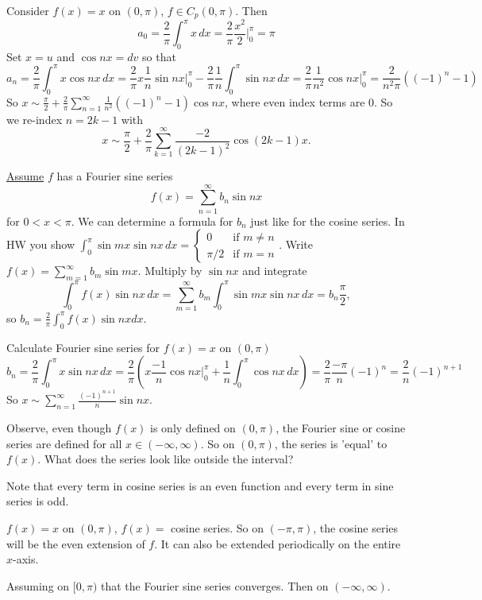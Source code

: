 \documentclass[]{article}
\begin{document}
\begin{example}
	Consider $f(x) = x$ on $(0,\pi)$, $f\in C_p(0,\pi)$. Then
	$$a_0 = \frac{2}{\pi}\int_0^\pi x \, dx = \frac{2}{\pi} \frac{x^2}{2}\bigg\rvert_0^\pi = \pi$$
	Set $x=u$ and $\cos nx = dv$ so that
	$$a_n = \frac{2}{\pi}\int_0^\pi x\cos{nx} \, dx = \frac{2}{\pi} x \frac{1}{n} \sin{nx} \bigg\rvert_0^\pi - \frac{2}{\pi} \frac{1}{n} \int_0^\pi \sin{nx} \, dx = \frac{2}{\pi} \frac{1}{n^2} \cos{nx}\bigg\rvert_0^\pi = \frac{2}{n^2\pi} \left( (-1)^n - 1\right)$$
	So $x\sim \frac{\pi}{2} + \frac{2}{\pi}\sum_{n=1}^\infty \frac{1}{n^2}((-1)^n-1) \cos{nx}$, where even index terms are 0. So we re-index $n=2k-1$ with $$x\sim \frac{\pi}{2} + \frac{2}{\pi} \sum_{k=1}^{\infty}\frac{-2}{(2k-1)^2}\cos(2k-1)x.$$
\end{example}

\underline{Assume} $f$ has a Fourier sine series
$$f(x) = \sum_{n=1}^\infty b_n \sin{nx}$$
for $0<x<\pi$.
We can determine a formula for $b_n$ just like for the cosine series.
In HW you show $\int_0^\pi \sin{mx} \sin{nx} \, dx = \begin{cases}0 &\text{if }m\neq n \\ \pi/2 &\text{if }m=n\end{cases}$.
Write $f(x) = \sum_{m=1}^{\infty} b_m \sin{mx}$. Multiply by $\sin{nx}$ and integrate
$$ \int_0^\pi f(x) \sin{nx} \, dx = \sum_{m=1}^\infty b_m \int_0^\pi \sin{mx} \sin{nx} \, dx = b_n \frac{\pi}{2},$$
so $b_n = \frac{2}{\pi}\int_0^\pi f(x) \sin{nx} dx$.

\begin{example}
	Calculate Fourier sine series for $f(x)=x$ on $(0,\pi)$
	$$b_n = \frac{2}{\pi}\int_0^\pi x\sin{nx} \, dx = \frac{2}{\pi} \left(x\frac{-1}{n} \cos{nx}\bigg\rvert_0^\pi + \frac{1}{n}\int_0^\pi \cos{nx} \, dx\right) = \frac{2}{\pi}\frac{-\pi}{n}(-1)^n=\frac{2}{n}(-1)^{n+1}$$
	So $x\sim \sum_{n=1}^\infty \frac{(-1)^{n+1}}{n}\sin{nx}$.
\end{example}

\begin{note}
	Observe, even though $f(x)$ is only defined on $(0,\pi)$, the Fourier sine or cosine series are defined for all $x\in(-\infty,\infty)$.
	So on $(0,\pi)$, the series is 'equal' to $f(x)$. What does the series look like outside the interval?
\end{note}
\begin{note}
	Note that every term in cosine series is an even function and every term in sine series is odd.
\end{note}
\begin{example}
	$f(x) = x$ on $(0,\pi)$, $f(x) = $ cosine series. So on $(-\pi,\pi)$, the cosine series will be the even extension of $f$. It can also be extended periodically on the entire $x$-axis.
\end{example}
\begin{example}
	Assuming on $[0,\pi)$ that the Fourier sine series converges. Then on $(-\infty,\infty)$.
\end{example}
\end{document}
